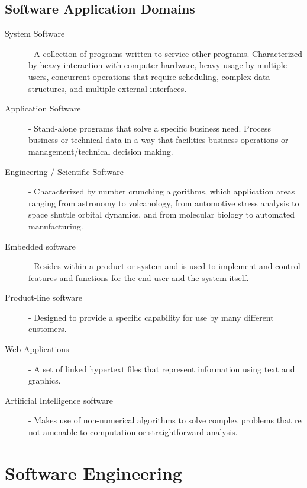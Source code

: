 \documentclass[12pt letter]{report}
\begin{document}
\section{Software Application Domains}
\begin{description}
  \item[System Software]  - A collection of programs written to service other programs. Characterized by heavy
        interaction with computer hardware, heavy usage by multiple users, concurrent operations that require scheduling,
        complex data structures, and multiple external interfaces.
  \item[Application Software] - Stand-alone programs that solve a specific business need. Process business or technical
        data in a way that facilities business operations or management/technical decision making.
  \item[Engineering / Scientific Software] - Characterized by number crunching algorithms, which application areas
        ranging from astronomy to volcanology, from automotive stress analysis to space shuttle orbital dynamics, and from
        molecular biology to automated manufacturing.
  \item[Embedded software] - Resides within a product or system and is used to implement and control features and
        functions for the end user and the system itself.
  \item[Product-line software] - Designed to provide a specific capability for use by many different customers.
  \item[Web Applications] - A set of linked hypertext files that represent information using text and graphics.
  \item[Artificial Intelligence software] - Makes use of non-numerical algorithms to solve complex problems that re not
        amenable to computation or straightforward analysis.
\end{description}

\chapter{Software Engineering}

\end{document}
